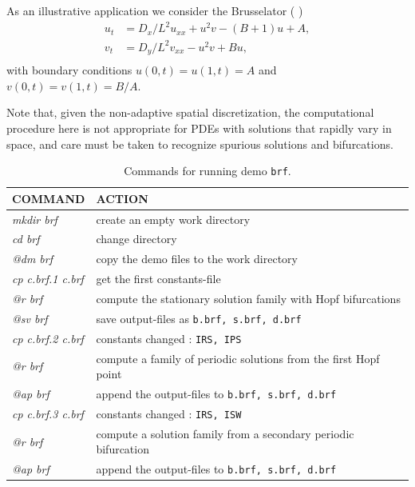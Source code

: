 \documentclass[12pt]{report}
\begin{document}
As an illustrative application we consider the Brusselator
( \citeyear{HoKnKu:87})
\begin{equation} \begin{array}{cl}
  u_t &= {D_x / L^2} u_{xx} + u^2v - (B+1)u + A,  \\
  v_t &= {D_y / L^2} v_{xx} - u^2v + Bu,  \\
\end{array} \end{equation}
with boundary conditions $u(0,t)=u(1,t)=A$
and $v(0,t)=v(1,t)=B/A$.

Note that, given the non-adaptive spatial discretization,
the computational procedure here is not appropriate for
PDEs with solutions that rapidly vary in space, and care must
be taken to recognize spurious solutions and bifurcations.


\begin{table}[htbp]
\begin{center}
\begin{tabular}{| l | l |}
\hline
  COMMAND  & ACTION \\
\hline
  {\it mkdir brf} & create an empty work directory \\ 
  {\it cd brf} & change directory \\
  {\it @dm brf} & copy the demo files to the work directory \\
\hline
  {\it cp c.brf.1 c.brf} & get the first constants-file \\ 
  {\it @r brf} & compute the stationary solution family with Hopf bifurcations \\ 
  {\it @sv brf} & save output-files as {\tt b.brf, s.brf, d.brf} \\ 
\hline
  {\it cp c.brf.2 c.brf} & constants changed : {\tt IRS, IPS} \\ 
  {\it @r brf} & compute a family of periodic solutions from the first Hopf point \\ 
  {\it @ap brf} & append the output-files to {\tt b.brf, s.brf, d.brf} \\ 
\hline
  {\it cp c.brf.3 c.brf} & constants changed : {\tt IRS, ISW} \\ 
  {\it @r brf} & compute a solution family from a secondary periodic bifurcation \\ 
  {\it @ap brf} & append the output-files to {\tt b.brf, s.brf, d.brf} \\ 
\hline
\end{tabular}
\caption{Commands for running demo {\tt brf}.}
\label{tbl:demo_brf}
\end{center}
\end{table}
\end{document}
